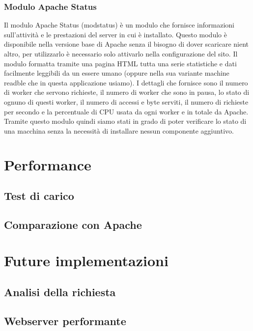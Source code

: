 \documentclass[italian]{tktltiki2}
\begin{document}
\subsubsection{Modulo Apache Status}
Il modulo Apache Status (modstatus) è un modulo che fornisce informazioni sull'attività e le prestazioni del server in cui è installato. Questo modulo è disponibile nella versione base di Apache senza il bisogno di dover scaricare nient altro, per utilizzarlo è necessario solo attivarlo nella configurazione del sito. Il modulo formatta tramite una pagina HTML tutta una serie statistiche e dati facilmente leggibili da un essere umano (oppure nella sua variante machine readble che in questa applicazione usiamo). I dettagli che fornisce sono il numero di worker che servono richieste, il numero di worker che sono in pausa, lo stato di ognuno di questi worker, il numero di accessi e byte serviti, il numero di richieste per secondo e la percentuale di CPU usata da ogni worker e in totale da Apache.
Tramite questo modulo quindi siamo stati in grado di poter verificare lo stato di una macchina senza la necessità di installare nessun componente aggiuntivo.
\newpage
\section{Performance}
\subsection{Test di carico}
\subsection{Comparazione con Apache}
\newpage
\section{Future implementazioni}
\subsection{Analisi della richiesta}
\subsection{Webserver performante}


%
%
% 
%
\end{document}
